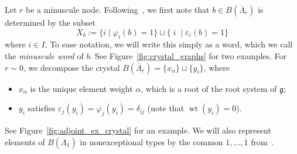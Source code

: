 \documentclass[reqno]{amsart}
\newcommand{\g}{\mathfrak{g}}
\newcommand{\clfw}{\overline{\Lambda}} %
\DeclareMathOperator{\wt}{wt} %
\newcommand{\bon}{\overline{1}}
\newcommand{\defn}[1]{{\color{darkred}\emph{#1}}} %
\theoremstyle{plain}
\theoremstyle{definition}
\numberwithin{equation}{section}
\begin{document}
Let $r$ be a minuscule node.
Following~\cite{JS10, Scrimshaw17}, we first note that $b \in B(\clfw_r)$ is determined by the subset
\[
X_b := \{i \mid \varphi_i(b) = 1\} \sqcup \{\overline{\imath} \mid \varepsilon_i(b) = 1\}
\]
where $i \in I$.
To ease notation, we will write this simply as a word, which we call the \defn{minuscule word} of $b$.
See Figure~\ref{fig:crystal_graphs} for two examples.
For $r \sim 0$, we decompose the crystal $B(\clfw_r) = \{x_{\alpha}\} \sqcup \{y_i\}$, where
\begin{itemize}
\item $x_{\alpha}$ is the unique element weight $\alpha$, which is a root of the root system of $\g$;
\item $y_i$ satisfies $\varepsilon_j(y_i) = \varphi_j(y_i) = \delta_{ij}$ (note that $\wt(y_i) = 0$).
\end{itemize}
See Figure~\ref{fig:adjoint_ex_crystal} for an example.
We will also represent elements of $B(\clfw_1)$ in nonexceptional types by the common $1, \dotsc, \bon$ from~\cite{KM94,KN94}.
\end{document}
